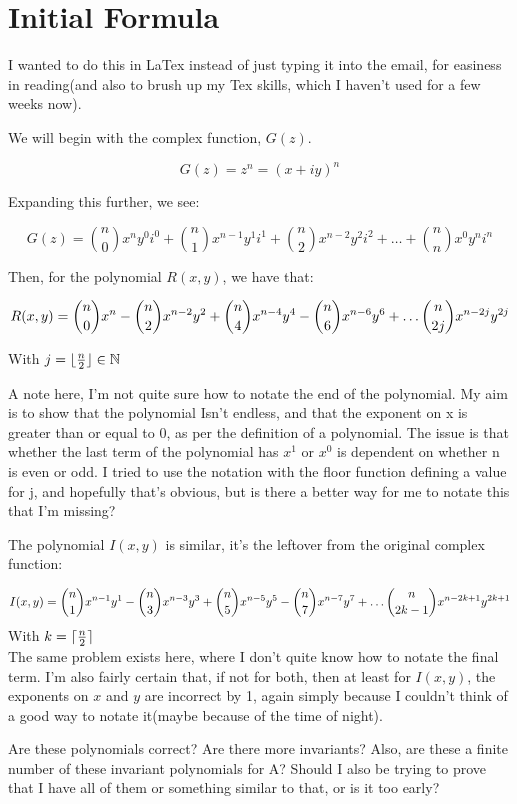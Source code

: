 \documentclass[12pt]{article}
\DeclarePairedDelimiter{\floor}{\lfloor}{\rfloor}
\DeclarePairedDelimiter{\ceil}{\lceil}{\rceil}
\begin{document}
\section*{Initial Formula}

I wanted to do this in LaTex instead of just typing it into the email, for easiness in reading(and also to brush up my Tex skills, which I haven't used for a few weeks now).

We will begin with the complex function, $G(z)$.

\[ 
	G(z) = z^n = (x + iy)^n 
\]

Expanding this further, we see:

\[
       	G(z) =  \binom{n}{0} x^ny^0i^0 +\binom{n}{1} x^{n-1}y^1i^1 + \binom{n}{2} x^{n-2}y^2i^2 + \ldots + \binom{n}{n} x^0y^ni^n 
\]


Then, for the polynomial $R(x,y)$, we have that:

\[
	R(x,y) = \binom{n}{0}x^n - \binom{n}{2}x^{n-2}y^2 + \binom{n}{4}x^{n-4}y^4 - \binom{n}{6}x^{n-6}y^6 + \ldots \space \binom{n}{2j}x^{n-2j}y^{2j}
\]

       	 With $j = \floor{\frac{n}{2}} \in \mathbb{N}$ 

A note here, I'm not quite sure how to notate the end of the polynomial. My aim is to show that the polynomial Isn't endless, and that the exponent on x is greater than or equal to 0, as per the definition of a polynomial. The issue is that whether the last term of the polynomial has $x^1$ or $x^0$ is dependent on whether n is even or odd. I tried to use the notation with the floor function defining a value for j, and hopefully that's obvious, but is there a better way for me to notate this that I'm missing? 

The polynomial $I(x,y)$ is similar, it's the leftover from the original complex function:

\[
	I(x,y) = \binom{n}{1}x^{n-1}y^1 - \binom{n}{3}x^{n-3}y^3 + \binom{n}{5}x^{n-5}y^5 - \binom{n}{7}x^{n-7}y^7 + \ldots \space \binom{n}{2k-1}x^{n-2k+1}y^{2k+1}
\]
	With $k = \ceil[Bigg]{\frac{n}{2}} $  \\
The same problem exists here, where I don't quite know how to notate the final term. I'm also fairly certain that, if not for both, then at least for $I(x,y)$, the exponents on $x$ and $y$ are incorrect by 1, again simply because I couldn't think of a good way to notate it(maybe because of the time of night).

Are these polynomials correct? Are there more invariants? Also, are these a finite number of these invariant polynomials for A? Should I also be trying to prove that I have all of them or something similar to that, or is it too early? 
\end{document}
